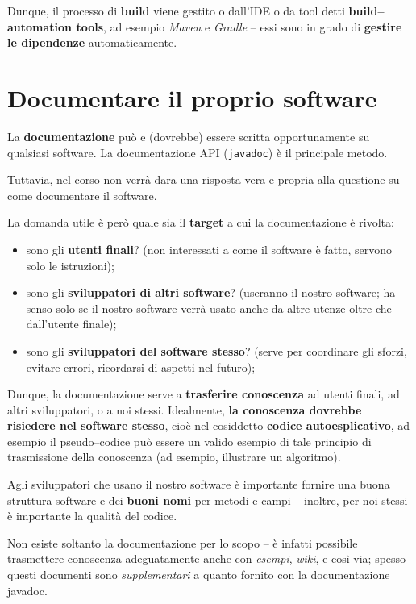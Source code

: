 \documentclass[\fontsizeclass,twocolumn]{\classname}
\let\oldtextsc\textsc
\renewcommand{\textsc}[1]{\oldtextsc{\scfontfs #1}}
\theoremstyle{definition}
\theoremstyle{definition}
\begin{document}
Dunque, il processo di \textbf{build} viene gestito o dall'\textsc{IDE} o da tool detti
\textbf{build--automation tools}, ad esempio \emph{Maven} e \emph{Gradle} --
essi sono in grado di \textbf{gestire le dipendenze} automaticamente.

\section{Documentare il proprio software}

La \textbf{documentazione} può e (dovrebbe) essere scritta opportunamente su
qualsiasi software. La documentazione API (\texttt{javadoc}) è il principale
metodo.

Tuttavia, nel corso non verrà dara una risposta vera e propria alla questione
su come documentare il software.

La domanda utile è però quale sia il \textbf{target} a cui la documentazione è
rivolta:
\begin{itemize}
    \item sono gli \textbf{utenti finali}? (non interessati a come il software
        è fatto, servono solo le istruzioni);
    \item sono gli \textbf{sviluppatori di altri software}? (useranno il nostro
        software; ha senso solo se il nostro software verrà usato anche da
        altre utenze oltre che dall'utente finale);
    \item sono gli \textbf{sviluppatori del software stesso}? (serve per
        coordinare gli sforzi, evitare errori, ricordarsi di aspetti nel
        futuro);
\end{itemize}

Dunque, la documentazione serve a \textbf{trasferire conoscenza} ad utenti
finali, ad altri sviluppatori, o a noi stessi. Idealmente, \textbf{la
conoscenza dovrebbe risiedere nel software stesso}, cioè nel cosiddetto
\textbf{codice autoesplicativo}, ad esempio il pseudo--codice può essere un
valido esempio di tale principio di trasmissione della conoscenza (ad esempio,
illustrare un algoritmo).

Agli sviluppatori che usano il nostro software è importante fornire una buona
struttura software e dei \textbf{buoni nomi} per metodi e campi -- inoltre, per
noi stessi è importante la qualità del codice.

Non esiste soltanto la documentazione per lo scopo -- è infatti possibile
trasmettere conoscenza adeguatamente anche con \emph{esempi}, \emph{wiki}, e
così via; spesso questi documenti sono \emph{supplementari} a quanto fornito
con la documentazione javadoc.
\end{document}
